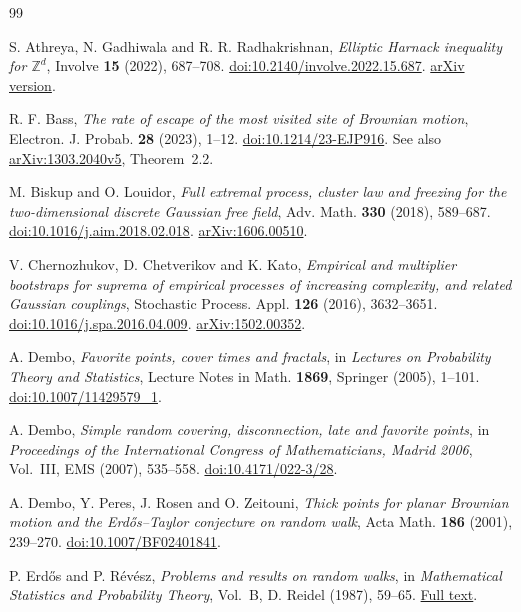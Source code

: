 \clearpage
\begin{thebibliography}{99}
\raggedright

S. Athreya, N. Gadhiwala and R. R. Radhakrishnan,
\emph{Elliptic Harnack inequality for $\mathbb Z^d$},
Involve \textbf{15} (2022), 687--708.
\href{https://doi.org/10.2140/involve.2022.15.687}{doi:10.2140/involve.2022.15.687}.
\href{https://arxiv.org/abs/2201.11947}{arXiv version}.

R. F. Bass,
\emph{The rate of escape of the most visited site of Brownian motion},
Electron. J. Probab. \textbf{28} (2023), 1--12.
\href{https://doi.org/10.1214/23-EJP916}{doi:10.1214/23-EJP916}.
See also \href{https://arxiv.org/abs/1303.2040v5}{arXiv:1303.2040v5},
Theorem~2.2.

M. Biskup and O. Louidor,
\emph{Full extremal process, cluster law and freezing for the two-dimensional
discrete Gaussian free field},
Adv. Math. \textbf{330} (2018), 589--687.
\href{https://doi.org/10.1016/j.aim.2018.02.018}{doi:10.1016/j.aim.2018.02.018}.
\href{https://arxiv.org/abs/1606.00510}{arXiv:1606.00510}.

V. Chernozhukov, D. Chetverikov and K. Kato,
\emph{Empirical and multiplier bootstraps for suprema of empirical processes
of increasing complexity, and related Gaussian couplings},
Stochastic Process. Appl. \textbf{126} (2016), 3632--3651.
\href{https://doi.org/10.1016/j.spa.2016.04.009}{doi:10.1016/j.spa.2016.04.009}.
\href{https://arxiv.org/abs/1502.00352}{arXiv:1502.00352}.

A. Dembo,
\emph{Favorite points, cover times and fractals},
in \emph{Lectures on Probability Theory and Statistics},
Lecture Notes in Math. \textbf{1869}, Springer (2005), 1--101.
\href{https://doi.org/10.1007/11429579_1}{doi:10.1007/11429579\_1}.

A. Dembo,
\emph{Simple random covering, disconnection, late and favorite points},
in \emph{Proceedings of the International Congress of Mathematicians,
Madrid 2006}, Vol.~III, EMS (2007), 535--558.
\href{https://doi.org/10.4171/022-3/28}{doi:10.4171/022-3/28}.

A. Dembo, Y. Peres, J. Rosen and O. Zeitouni,
\emph{Thick points for planar Brownian motion and the Erd\H{o}s--Taylor
conjecture on random walk},
Acta Math. \textbf{186} (2001), 239--270.
\href{https://doi.org/10.1007/BF02401841}{doi:10.1007/BF02401841}.

P. Erd\H{o}s and P. R\'ev\'esz,
\emph{Problems and results on random walks},
in \emph{Mathematical Statistics and Probability Theory}, Vol.~B,
D. Reidel (1987), 59--65.
\href{https://renyi.hu/~p_erdos/1987-26.pdf}{Full text}.


\end{thebibliography}

